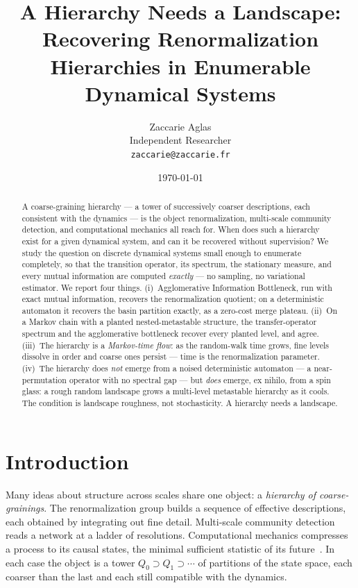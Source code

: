\documentclass[11pt]{article}
\title{A Hierarchy Needs a Landscape:\\
Recovering Renormalization Hierarchies in Enumerable Dynamical Systems}
\author{Zaccarie Aglas\\ Independent Researcher\\ \texttt{zaccarie@zaccarie.fr}}
\date{\today}
\begin{document}
\maketitle

\begin{abstract}
A coarse-graining hierarchy --- a tower of successively coarser descriptions,
each consistent with the dynamics --- is the object renormalization,
multi-scale community detection, and computational mechanics all reach for.
When does such a hierarchy exist for a given dynamical system, and can it be
recovered without supervision? We study the question on discrete dynamical
systems small enough to enumerate completely, so that the transition operator,
its spectrum, the stationary measure, and every mutual information are computed
\emph{exactly} --- no sampling, no variational estimator. We report four
things. (i)~Agglomerative Information Bottleneck, run with exact mutual
information, recovers the renormalization quotient; on a deterministic
automaton it recovers the basin partition exactly, as a zero-cost merge
plateau. (ii)~On a Markov chain with a planted nested-metastable structure, the
transfer-operator spectrum and the agglomerative bottleneck recover every
planted level, and agree. (iii)~The hierarchy is a \emph{Markov-time flow}: as
the random-walk time grows, fine levels dissolve in order and coarse ones
persist --- time is the renormalization parameter. (iv)~The hierarchy does
\emph{not} emerge from a noised deterministic automaton --- a near-permutation
operator with no spectral gap --- but \emph{does} emerge, ex nihilo, from a
spin glass: a rough random landscape grows a multi-level metastable hierarchy
as it cools. The condition is landscape roughness, not stochasticity. A
hierarchy needs a landscape.
\end{abstract}

\section{Introduction}
\label{sec:intro}

Many ideas about structure across scales share one object: a \emph{hierarchy of
coarse-grainings}. The renormalization group builds a sequence of effective
descriptions, each obtained by integrating out fine detail. Multi-scale
community detection reads a network at a ladder of resolutions. Computational
mechanics compresses a process to its causal states, the minimal sufficient
statistic of its future~\citep{crutchfield1989}. In each case the object is a tower
$Q_0 \supset Q_1 \supset \cdots$ of partitions of the state space, each coarser
than the last and each still compatible with the dynamics.
\end{document}
